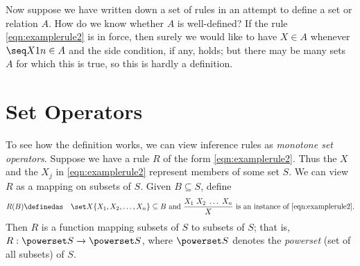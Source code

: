 Now suppose we have written down a set of rules in an attempt to define a set or relation $A$. How do we know whether $A$ is well-defined? If the rule \eqref{eqn:examplerule2} is in force, then surely we would like to have $X\in A$ whenever $\seq X1n\in A$ and the side condition, if any, holds; but there may be many sets $A$ for which this is true, so this is hardly a definition.

\section{Set Operators}

To see how the definition works, we can view inference rules as \emph{monotone set operators}. Suppose we have a rule $R$ of the form \eqref{eqn:examplerule2}.
%
%
Thus the $X$ and the $X_j$ in \eqref{eqn:examplerule2} represent members of some set $S$. We can view $R$ as a mapping on subsets of $S$. Given $B\subseteq S$, define
\begin{eqnarray*}
R(B) &\definedas& \set X{\{X_1,X_2,\ldots,X_n\}\subseteq B\text{ and } \displaystyle\frac{X_1\ X_2\ \ldots\ X_n}X\text{ is an instance of \eqref{eqn:examplerule2}}}.
\end{eqnarray*}
Then $R$ is a function mapping subsets of $S$ to subsets of $S$; that is, $R:\powerset S\to\powerset S$, where $\powerset S$ denotes the \emph{powerset} (set of all subsets) of $S$.

